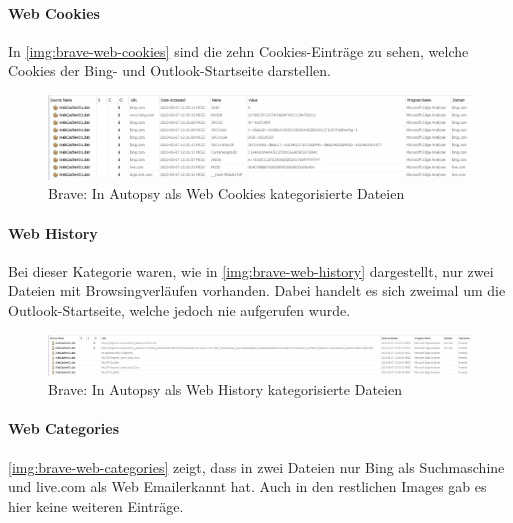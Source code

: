 \begin{appendices}
\paragraph*{Web Cookies}\label{chap:anhang-brave-uncommon-locations-autopsy-web-cookies}
In \autoref{img:brave-web-cookies} sind die zehn Cookies-Einträge zu sehen, welche Cookies der Bing- und Outlook-Startseite darstellen. 

\begin{figure}[ht]
	\centering
	\includegraphics[width=\textwidth]{bilder/BRCoo.png}
	\caption{Brave: In Autopsy als \glqq{}Web Cookies\grqq{} kategorisierte Dateien}
	\label{img:brave-web-cookies}  
\end{figure}

\paragraph*{Web History}\label{chap:anhang-brave-uncommon-locations-autopsy-web-history}

Bei dieser Kategorie waren, wie in \autoref{img:brave-web-history} dargestellt, nur zwei Dateien mit Browsingverläufen vorhanden. Dabei handelt es sich zweimal um die Outlook-Startseite, welche jedoch nie aufgerufen wurde.

\begin{figure}[ht]
	\centering
	\includegraphics[width=\textwidth]{bilder/BRHis.png}
	\caption{Brave: In Autopsy als \glqq{}Web History\grqq{} kategorisierte Dateien}
	\label{img:brave-web-history}  
\end{figure}

\paragraph*{Web Categories}\label{chap:anhang-brave-uncommon-locations-autopsy-web-categories}
\autoref{img:brave-web-categories} zeigt, dass in zwei Dateien nur Bing als Suchmaschine und live.com als \glqq{}Web Email\grqq erkannt hat. Auch in den restlichen Images gab es hier keine weiteren Einträge.


\end{appendices}
